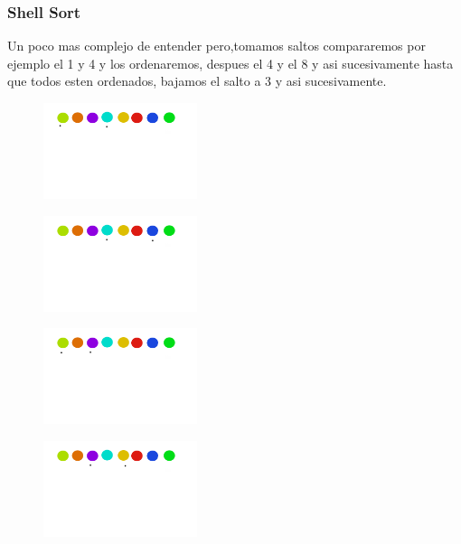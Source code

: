 \documentclass[12pt, fleqn]{report}                             %
\theoremstyle{break}                                            %
\begin{document}
        \subsubsection{Shell Sort}
        Un poco mas complejo de entender pero,tomamos saltos compararemos por ejemplo el 1 y 4 y los ordenaremos, despues el 4 y el 8 y asi sucesivamente hasta que todos esten ordenados, bajamos el salto a 3 y asi sucesivamente.
        \begin{figure}[h]
                        \centering
                        \includegraphics[width=0.4\textwidth]{graphics/Shell1.png}
                    \end{figure}
    	
    	\begin{figure}[h]
                        \centering
                        \includegraphics[width=0.4\textwidth]{graphics/Shell2.png}
                    \end{figure}
    
    	\begin{figure}[h]
                        \centering
                        \includegraphics[width=0.4\textwidth]{graphics/Shell3.png}
                    \end{figure}
    	
    	\begin{figure}[h]
                        \centering
                        \includegraphics[width=0.4\textwidth]{graphics/Shell4.png}
                    \end{figure}
    	
\end{document}
